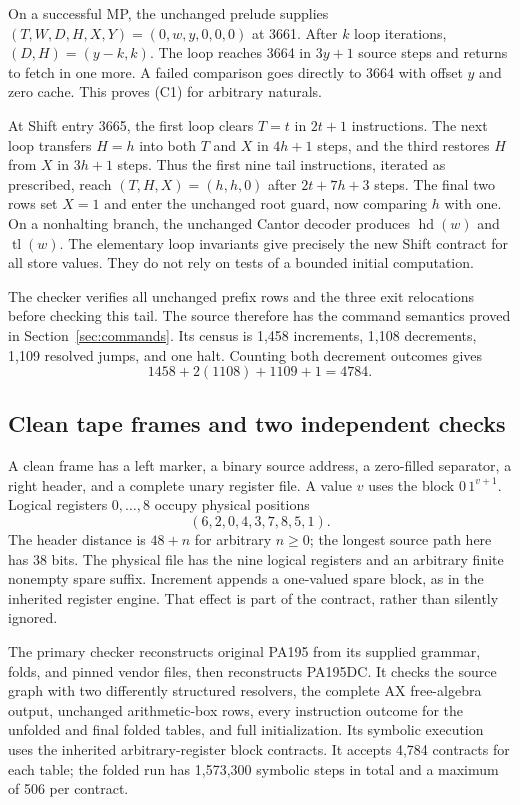 On a successful MP, the unchanged prelude supplies
$(T,W,D,H,X,Y)=(0,w,y,0,0,0)$ at 3661. After $k$ loop iterations,
$(D,H)=(y-k,k)$. The loop reaches 3664 in $3y+1$ source steps and
returns to fetch in one more. A failed comparison goes directly to 3664
with offset $y$ and zero cache. This proves (C1) for arbitrary naturals.

At Shift entry 3665, the first loop clears $T=t$ in $2t+1$ instructions.
The next loop transfers $H=h$ into both $T$ and $X$ in $4h+1$ steps,
and the third restores $H$ from $X$ in $3h+1$ steps. Thus the first nine
tail instructions, iterated as prescribed, reach $(T,H,X)=(h,h,0)$
after $2t+7h+3$ steps. The final two rows set $X=1$ and enter the
unchanged root guard, now comparing $h$ with one. On a nonhalting branch,
the unchanged Cantor decoder produces $\operatorname{hd}(w)$ and
$\operatorname{tl}(w)$. The elementary loop invariants give precisely
the new Shift contract for all store values. They do not rely on tests
of a bounded initial computation.

The checker verifies all unchanged prefix rows and the three exit
relocations before checking this tail. The source therefore has the
command semantics proved in Section~\ref{sec:commands}. Its census is
1,458 increments, 1,108 decrements, 1,109 resolved jumps, and one halt.
Counting both decrement outcomes gives
\[
 1458+2(1108)+1109+1=4784.
\]

\subsection{Clean tape frames and two independent checks}

A clean frame has a left marker, a binary source address, a zero-filled
separator, a right header, and a complete unary register file. A value $v$
uses the block $0\,1^{v+1}$. Logical registers $0,\ldots,8$ occupy physical
positions
\[
 (6,2,0,4,3,7,8,5,1).
\]
The header distance is $48+n$ for arbitrary $n\ge0$; the longest source
path here has 38 bits. The physical file has the nine logical registers
and an arbitrary finite nonempty spare suffix. Increment appends a
one-valued spare block, as in the inherited register engine. That effect
is part of the contract, rather than silently ignored.

The primary checker reconstructs original PA195 from its supplied grammar,
folds, and pinned vendor files, then reconstructs PA195DC. It checks the
source graph with two differently structured resolvers, the complete AX
free-algebra output, unchanged arithmetic-box rows, every instruction
outcome for the unfolded and final folded tables, and full initialization.
Its symbolic execution uses the inherited arbitrary-register block
contracts. It accepts 4,784 contracts for each table; the folded run has
1,573,300 symbolic steps in total and a maximum of 506 per contract.

